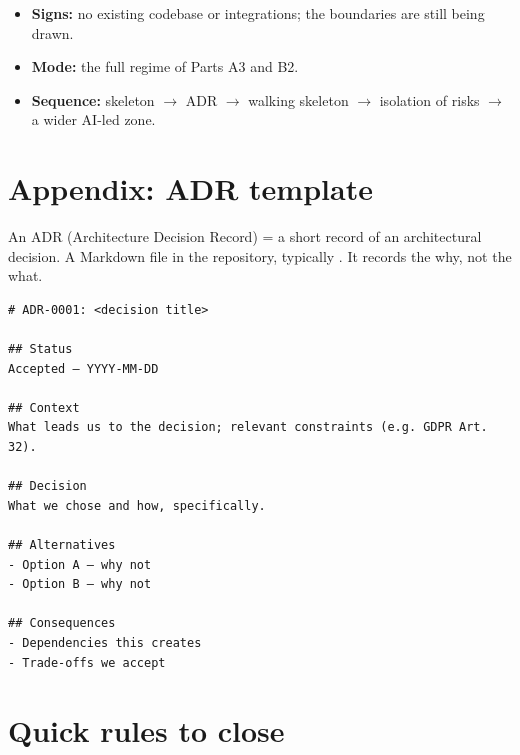 \begin{itemize}
\item \textbf{Signs:} no existing codebase or integrations; the boundaries are still being drawn.
\item \textbf{Mode:} the full regime of Parts A3 and B2.
\item \textbf{Sequence:} skeleton $\rightarrow$ ADR $\rightarrow$ walking skeleton $\rightarrow$ isolation of risks $\rightarrow$ a wider AI-led zone.
\end{itemize}

\section{Appendix: ADR template}

An ADR (Architecture Decision Record) = a short record of an architectural decision.
A Markdown file in the repository, typically .
It records the why, not the what.

\begin{tcolorbox}[colback=black!3,colframe=black!20,boxrule=0.4pt,arc=1pt,
  left=8pt,right=8pt,top=6pt,bottom=6pt,fontupper=\ttfamily\small]
\begin{Verbatim}[breaklines=true]
# ADR-0001: <decision title>

## Status
Accepted — YYYY-MM-DD

## Context
What leads us to the decision; relevant constraints (e.g. GDPR Art. 32).

## Decision
What we chose and how, specifically.

## Alternatives
- Option A — why not
- Option B — why not

## Consequences
- Dependencies this creates
- Trade-offs we accept
\end{Verbatim}
\end{tcolorbox}

\section{Quick rules to close}

